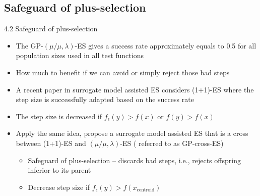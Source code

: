 \documentclass{beamer}
\begin{document}
\subsection{Safeguard of plus-selection}

\begin{frame}{4.2 Safeguard of plus-selection}
\begin{itemize}
    \item The GP-$(\mu/\mu,\lambda)$-ES gives a success rate approximately equals to 0.5 for all population sizes used in all test functions
    \item How much to benefit if we can avoid or simply reject those bad steps
    \item A recent paper in surrogate model assisted ES considers (1+1)-ES where the step size is successfully adapted based on the success rate 
        \item The step size is decreased if $f_\epsilon(y)>f(x)$ or $f(y)>f(x)$
    \begin{itemize}
    \end{itemize}
    \item Apply the same idea, propose a surrogate model assisted ES that is a cross between (1+1)-ES and $(\mu/\mu,\lambda)$-ES ( referred to as GP-cross-ES)
        \begin{itemize}
            \item Safeguard of plus-selection -- discards bad steps, i.e., rejects offspring inferior to its parent
            \item Decrease step size if $f_\epsilon(y)>f(x_{\text{centroid}})$
        \end{itemize}
        
\end{itemize}
\end{frame}
\end{document}
